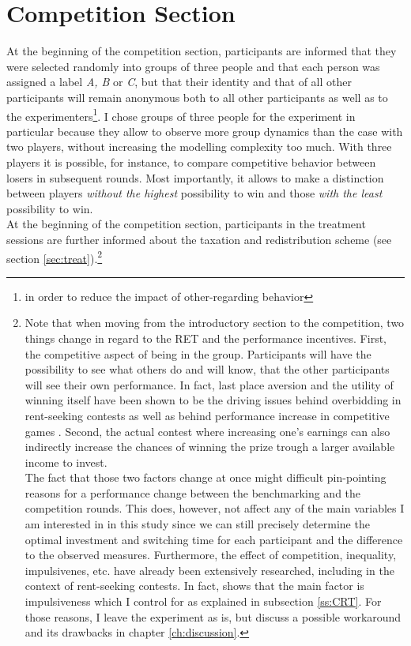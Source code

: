     
    \section{Competition Section}
    \label{ss:compt}
    
    At the beginning of the competition section, participants are informed that they were selected randomly into groups of three people and that each person was assigned a label \textit{A, B} or \textit{C}, but that their identity and that of all other participants will remain anonymous both to all other participants as well as to the experimenters\footnote{in order to reduce the impact of other-regarding behavior}. I chose groups of three people for the experiment in particular because they allow to observe more group dynamics than the case with two players, without increasing the modelling complexity too much. With three players it is possible, for instance, to compare competitive behavior between losers in subsequent rounds. Most importantly, it allows to make a distinction between players \textit{without the highest} possibility to win and those \textit{with the least} possibility to win.\\
    
    At the beginning of the competition section, participants in the treatment sessions are further informed about the taxation and redistribution scheme (see section \ref{sec:treat}).\footnote{Note that when moving from the introductory section to the competition, two things change in regard to the RET and the performance incentives. First, the competitive aspect of being in the group. Participants will have the possibility to see what others do and will know, that the other participants will see their own performance. In fact, last place aversion and the utility of winning itself have been shown to be the driving issues behind overbidding in rent-seeking contests as well as behind performance increase in competitive games \citep{sheremeta2013}. Second, the actual contest where increasing one's earnings can also indirectly increase the chances of winning the prize trough a larger available income to invest.\\
    The fact that those two factors change at once might difficult pin-pointing reasons for a performance change between the benchmarking and the competition rounds. This does, however, not affect any of the main variables I am interested in in this study since we can still precisely determine the optimal investment and switching time for each participant and the difference to the observed measures. Furthermore, the effect of competition, inequality, impulsivenes, etc. have already been extensively researched, including in the context of rent-seeking contests. In fact, \cite{sheremeta2016} shows that the main factor is impulsiveness which I control for as explained in subsection \ref{ss:CRT}. For those reasons, I leave the experiment as is, but discuss a possible workaround and its drawbacks in chapter \ref{ch:discussion}.} 
    
